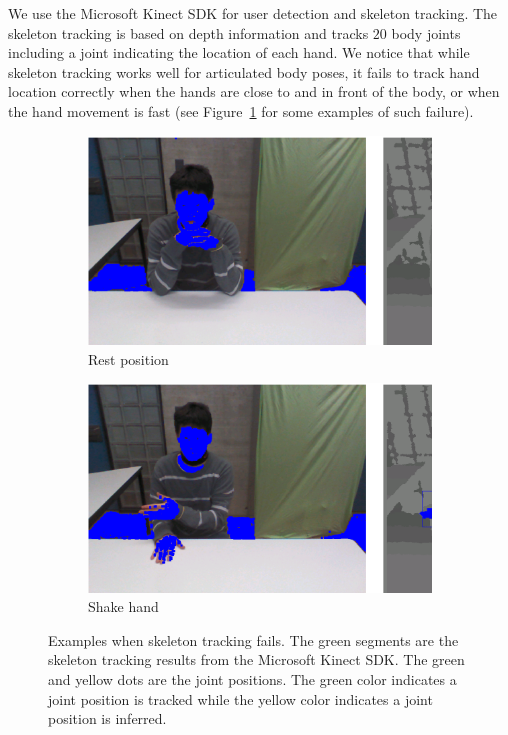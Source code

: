 \documentclass{acm_proc_article-sp}
\begin{document}
We use the Microsoft Kinect SDK for user detection and skeleton tracking. The
skeleton tracking is based on depth information and tracks $20$ body joints
including a joint indicating the location of each hand.
We notice that while skeleton tracking works well for articulated body poses,
it fails to track hand location correctly when the hands are close to and in
front of the body, or when the hand movement is fast (see Figure~\ref{fig:skin} for
some examples of such failure).

\begin{figure}
\centering
\begin{subfigure}{0.485\textwidth}
  \centering
  \includegraphics[width=1\columnwidth]{fig/rest.ps}
  \caption{Rest position}
\end{subfigure}
\begin{subfigure}{0.485\textwidth}
  \centering
  \includegraphics[width=1\columnwidth]{fig/shakehand.ps}
  \caption{Shake hand}
\end{subfigure}
\caption{Examples when skeleton tracking fails. The green segments are the skeleton tracking
results from the Microsoft Kinect SDK. The green and yellow dots are the joint positions. The 
green color indicates a joint position is tracked while the yellow color indicates a joint position is inferred.}
\label{fig:skin}
\end{figure}
\end{document}
